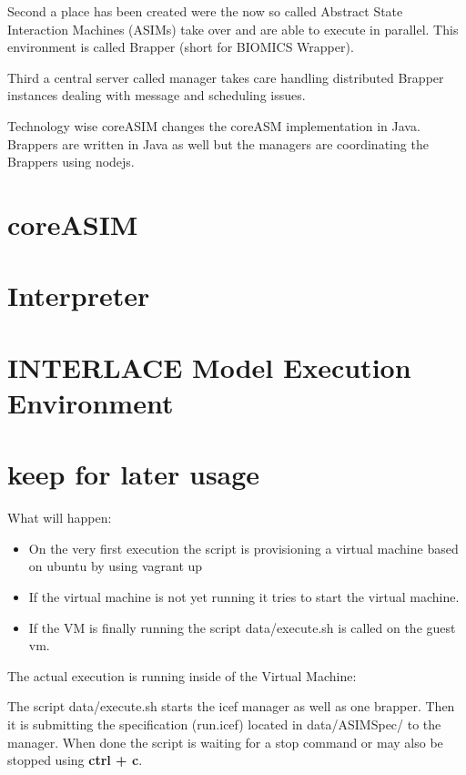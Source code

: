 Second a place has been created were the now so called Abstract State Interaction Machines (ASIMs) take over and are able to execute in parallel. This environment is called Brapper (short for BIOMICS Wrapper).

Third a central server called manager takes care handling distributed Brapper instances dealing with message and scheduling issues.

Technology wise coreASIM changes the coreASM implementation in Java. Brappers are written in Java as well but the managers are coordinating the Brappers using nodejs.

\section{coreASIM}

\section{Interpreter}

\section{INTERLACE Model Execution Environment}
\label{sec:env-exec}

\section{keep for later usage}
What will happen:
\begin{itemize}
	\item On the very first execution the script is provisioning a virtual machine based on ubuntu by using vagrant up
	\item If the virtual machine is not yet running it tries to start the virtual machine.
	\item If the VM is finally running the script data/execute.sh is called on the guest vm.
\end{itemize}

The actual execution is running inside of the Virtual Machine:

The script data/execute.sh starts the icef manager as well as one brapper. Then it is submitting the specification (run.icef) located in data/ASIMSpec/ to the manager. When done the script is waiting for a stop command or may also be stopped using \textbf{ctrl + c}.

